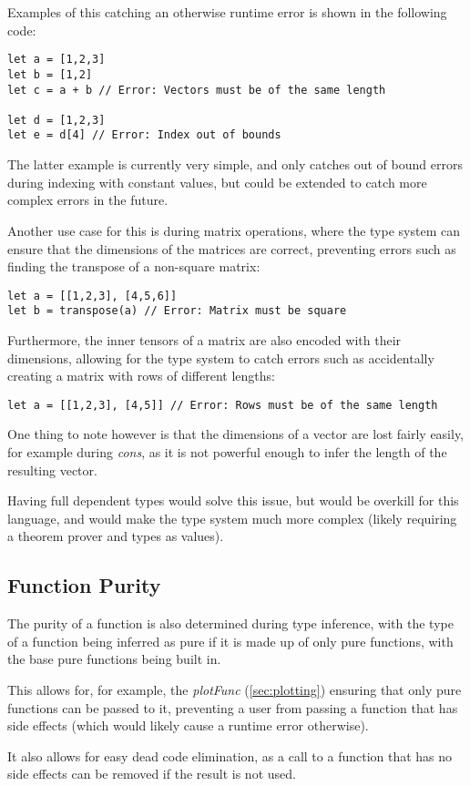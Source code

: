 Examples of this catching an otherwise runtime error is shown in the following code:

\begin{verbatim}
let a = [1,2,3]
let b = [1,2]
let c = a + b // Error: Vectors must be of the same length
    
let d = [1,2,3]
let e = d[4] // Error: Index out of bounds
\end{verbatim}

The latter example is currently very simple, and only catches out of bound errors during indexing with constant
values, but could be extended to catch more complex errors in the future.

Another use case for this is during matrix operations, where the type system can ensure that the dimensions of the
matrices are correct, preventing errors such as finding the transpose of a non-square matrix:

\begin{verbatim}
let a = [[1,2,3], [4,5,6]]
let b = transpose(a) // Error: Matrix must be square
\end{verbatim}

Furthermore, the inner tensors of a matrix are also encoded with their dimensions, allowing for the type system to catch
errors such as accidentally creating a matrix with rows of different lengths:

\begin{verbatim}
let a = [[1,2,3], [4,5]] // Error: Rows must be of the same length
\end{verbatim}

One thing to note however is that the dimensions of a vector are lost fairly easily, for example during 
\textit{cons}, as it is not powerful enough to infer the length of the resulting vector.

Having full dependent types would solve this issue, but would be overkill for this language, and would make the
type system much more complex (likely requiring a theorem prover and types as values).

\subsection{Function Purity}\label{subsec:function-purity}

The purity of a function is also determined during type inference, with the type of a function being inferred as
pure if it is made up of only pure functions, with the base pure functions being built in.

This allows for, for example, the \textit{plotFunc} (\ref{sec:plotting}) ensuring that only pure functions can be 
passed to it, preventing a user from passing a function that has side effects (which would likely cause a runtime 
error otherwise).

It also allows for easy dead code elimination, as a call to a function that has no side effects can be removed if the
result is not used.
